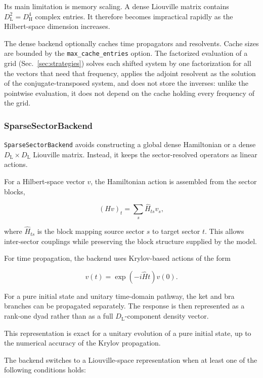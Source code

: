\documentclass[11pt]{article}
\begin{document}
Its main limitation is memory scaling. A dense Liouville matrix contains
\(D_{\mathrm{L}}^2=D_{\mathrm{H}}^4\) complex entries. It therefore becomes
impractical rapidly as the Hilbert-space dimension increases.

The dense backend optionally caches time propagators and resolvents. Cache
sizes are bounded by the \texttt{max\_cache\_entries} option. The factorized evaluation of a grid (Sec.~\ref{sec:strategies}) solves each shifted system by one factorization for all the vectors that need that frequency, applies the adjoint resolvent as the solution of the conjugate-transposed system, and does not store the inverses: unlike the pointwise evaluation, it does not depend on the cache holding every frequency of the grid.

\subsubsection*{SparseSectorBackend}

\texttt{SparseSectorBackend} avoids constructing a global dense Hamiltonian or
a dense \(D_{\mathrm{L}}\times D_{\mathrm{L}}\) Liouville matrix. Instead, it
keeps the sector-resolved operators as linear actions.

For a Hilbert-space vector \(v\), the Hamiltonian action is assembled from the
sector blocks,

\begin{equation}
(Hv)_t
=
\sum_s \hat{H}_{ts}v_s,
\end{equation}

where \(\hat{H}_{ts}\) is the block mapping source sector \(s\) to target sector
\(t\). This allows inter-sector couplings while preserving the block
structure supplied by the model.

For time propagation, the backend uses Krylov-based actions of the form

\begin{equation}
v(t)
=
\exp(-i\hat{H}t)v(0).
\end{equation}

For a pure initial state and unitary time-domain pathway, the ket and bra
branches can be propagated separately. The response is then represented as a
rank-one dyad rather than as a full \(D_{\mathrm{L}}\)-component density
vector.

This representation is exact for a unitary evolution of a pure initial state,
up to the numerical accuracy of the Krylov propagation.

The backend switches to a Liouville-space representation when at least one of
the following conditions holds:
\end{document}
